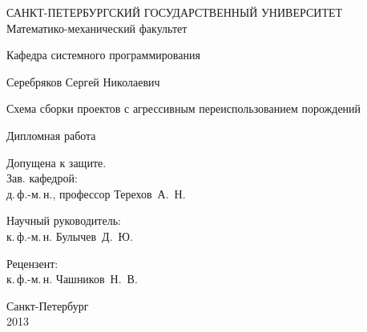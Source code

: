 %
%
\thispagestyle{empty}
\begin{center}
САНКТ-ПЕТЕРБУРГСКИЙ ГОСУДАРСТВЕННЫЙ УНИВЕРСИТЕТ\\
Математико-механический факультет\\
\end{center}

\begin{center}
Кафедра системного программирования\\
\end{center}
\vspace{2cm}
\begin{center}
    \large{Серебряков Сергей Николаевич}
\end{center}
\begin{center}
    \LARGE{Схема сборки проектов с агрессивным переиспользованием порождений} \\
\end{center}
\begin{center}
    \normalsize{Дипломная работа}
\end{center}
\vspace{1cm}
\noindent
\begin{flushright}
    \small
	Допущена к защите. \\
	Зав. кафедрой: \\
	д.\,ф.-м.\,н., профессор Терехов~А.~Н.
\end{flushright}
\vspace{1cm}
\begin{flushright}
	\small
	Научный руководитель: \\
	к.\,ф.-м.\,н. Булычев~Д.~Ю.
\end{flushright}
\vspace{1cm}
\begin{flushright}
	\small
	Рецензент: \\
	к.\,ф.-м.\,н. Чашников~Н.~В.
\end{flushright}
\vspace{\fill}
\begin{center}
    \small
    Санкт-Петербург\\2013
\end{center}
